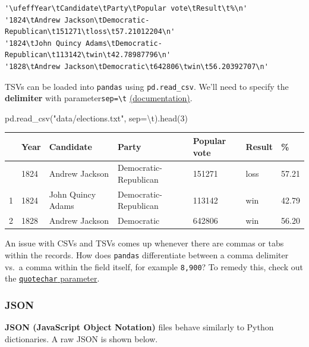 \documentclass[
  letterpaper,
  DIV=11,
  numbers=noendperiod]{scrreprt}
\newenvironment{Shaded}{\begin{snugshade}}{\end{snugshade}}
\newcommand{\CharTok}[1]{\textcolor[rgb]{0.13,0.47,0.30}{#1}}
\newcommand{\DecValTok}[1]{\textcolor[rgb]{0.68,0.00,0.00}{#1}}
\newcommand{\NormalTok}[1]{\textcolor[rgb]{0.00,0.23,0.31}{#1}}
\newcommand{\OperatorTok}[1]{\textcolor[rgb]{0.37,0.37,0.37}{#1}}
\newcommand{\StringTok}[1]{\textcolor[rgb]{0.13,0.47,0.30}{#1}}
\begin{document}
\begin{verbatim}
'\ufeffYear\tCandidate\tParty\tPopular vote\tResult\t%\n'
'1824\tAndrew Jackson\tDemocratic-Republican\t151271\tloss\t57.21012204\n'
'1824\tJohn Quincy Adams\tDemocratic-Republican\t113142\twin\t42.78987796\n'
'1828\tAndrew Jackson\tDemocratic\t642806\twin\t56.20392707\n'
\end{verbatim}

TSVs can be loaded into \texttt{pandas} using \texttt{pd.read\_csv}.
We'll need to specify the \textbf{delimiter} with
parameter\texttt{sep=\textquotesingle{}\textbackslash{}t\textquotesingle{}}
\href{https://pandas.pydata.org/docs/reference/api/pandas.read_csv.html}{(documentation)}.

\begin{Shaded}
\begin{Highlighting}[]
\NormalTok{pd.read\_csv(}\StringTok{"data/elections.txt"}\NormalTok{, sep}\OperatorTok{=}\StringTok{\textquotesingle{}}\CharTok{\textbackslash{}t}\StringTok{\textquotesingle{}}\NormalTok{).head(}\DecValTok{3}\NormalTok{)}
\end{Highlighting}
\end{Shaded}

\begin{longtable}[]{@{}lllllll@{}}
\toprule\noalign{}
& Year & Candidate & Party & Popular vote & Result & \% \\
\midrule\noalign{}
\endhead
\bottomrule\noalign{}
\endlastfoot
0 & 1824 & Andrew Jackson & Democratic-Republican & 151271 & loss &
57.21 \\
1 & 1824 & John Quincy Adams & Democratic-Republican & 113142 & win &
42.79 \\
2 & 1828 & Andrew Jackson & Democratic & 642806 & win & 56.20 \\
\end{longtable}

An issue with CSVs and TSVs comes up whenever there are commas or tabs
within the records. How does \texttt{pandas} differentiate between a
comma delimiter vs.~a comma within the field itself, for example
\texttt{8,900}? To remedy this, check out the
\href{https://pandas.pydata.org/docs/reference/api/pandas.read_csv.html}{\texttt{quotechar}
parameter}.

\subsubsection{JSON}\label{json}

\textbf{JSON (JavaScript Object Notation)} files behave similarly to
Python dictionaries. A raw JSON is shown below.
\end{document}
